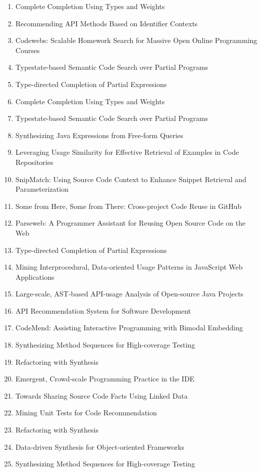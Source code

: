 \begin{enumerate}
\item Complete Completion Using Types and Weights
\item Recommending API Methods Based on Identifier Contexts
\item Codewebs: Scalable Homework Search for Massive Open Online Programming Courses
\item Typestate-based Semantic Code Search over Partial Programs
\item Type-directed Completion of Partial Expressions
\item Complete Completion Using Types and Weights
\item Typestate-based Semantic Code Search over Partial Programs
\item Synthesizing Java Expressions from Free-form Queries
\item Leveraging Usage Similarity for Effective Retrieval of Examples in Code Repositories
\item SnipMatch: Using Source Code Context to Enhance Snippet Retrieval and Parameterization
\item Some from Here, Some from There: Cross-project Code Reuse in GitHub
\item Parseweb: A Programmer Assistant for Reusing Open Source Code on the Web
\item Type-directed Completion of Partial Expressions
\item Mining Interprocedural, Data-oriented Usage Patterns in JavaScript Web Applications
\item Large-scale, AST-based API-usage Analysis of Open-source Java Projects
\item API Recommendation System for Software Development
\item CodeMend: Assisting Interactive Programming with Bimodal Embedding
\item Synthesizing Method Sequences for High-coverage Testing
\item Refactoring with Synthesis
\item Emergent, Crowd-scale Programming Practice in the IDE
\item Towards Sharing Source Code Facts Using Linked Data
\item Mining Unit Tests for Code Recommendation
\item Refactoring with Synthesis
\item Data-driven Synthesis for Object-oriented Frameworks
\item Synthesizing Method Sequences for High-coverage Testing

\end{enumerate}
